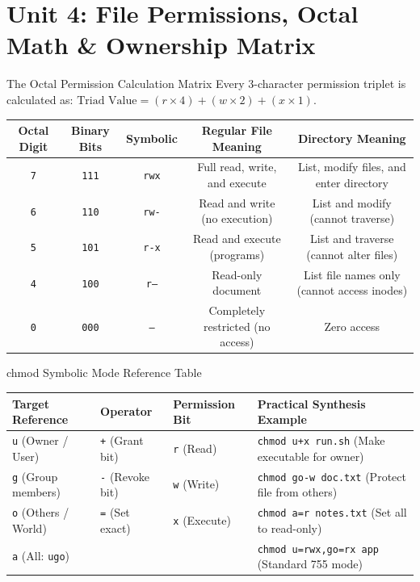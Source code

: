 \chapter{Unit 4: File Permissions, Octal Math \& Ownership Matrix}

\begin{cheatbox}{The Octal Permission Calculation Matrix}
Every 3-character permission triplet is calculated as: $\text{Triad Value} = (r \times 4) + (w \times 2) + (x \times 1)$.
\begin{center}
\begin{tabular}{c c c c c}
\toprule
\textbf{Octal Digit} & \textbf{Binary Bits} & \textbf{Symbolic} & \textbf{Regular File Meaning} & \textbf{Directory Meaning} \\
\midrule
\texttt{7} & \texttt{111} & \texttt{rwx} & Full read, write, and execute & List, modify files, and enter directory \\
\texttt{6} & \texttt{110} & \texttt{rw-} & Read and write (no execution) & List and modify (cannot traverse) \\
\texttt{5} & \texttt{101} & \texttt{r-x} & Read and execute (programs) & List and traverse (cannot alter files) \\
\texttt{4} & \texttt{100} & \texttt{r--} & Read-only document & List file names only (cannot access inodes) \\
\texttt{0} & \texttt{000} & \texttt{---} & Completely restricted (no access) & Zero access \\
\bottomrule
\end{tabular}
\end{center}
\end{cheatbox}

\begin{syntaxbox}{chmod Symbolic Mode Reference Table}
\begin{tabularx}{\linewidth}{l l l X}
\toprule
\textbf{Target Reference} & \textbf{Operator} & \textbf{Permission Bit} & \textbf{Practical Synthesis Example} \\
\midrule
\texttt{u} (Owner / User) & \texttt{+} (Grant bit) & \texttt{r} (Read) & \texttt{chmod u+x run.sh} (Make executable for owner) \\
\texttt{g} (Group members) & \texttt{-} (Revoke bit) & \texttt{w} (Write) & \texttt{chmod go-w doc.txt} (Protect file from others) \\
\texttt{o} (Others / World) & \texttt{=} (Set exact) & \texttt{x} (Execute) & \texttt{chmod a=r notes.txt} (Set all to read-only) \\
\texttt{a} (All: \texttt{ugo}) & & & \texttt{chmod u=rwx,go=rx app} (Standard 755 mode) \\
\bottomrule
\end{tabularx}
\end{syntaxbox}

